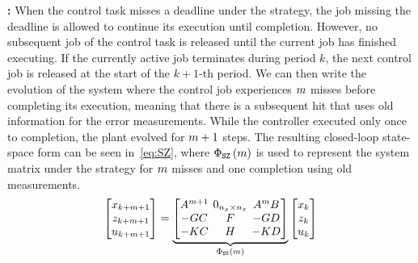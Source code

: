 \textbf{\tSZ{}: }%
%
When the control task misses a deadline under the \tS{} strategy, the job missing the deadline is allowed to continue its execution until completion.
However, no subsequent job of the control task is released until the current job has finished executing.
If the currently active job terminates during period $k$, the next control job is released at the start of the $k+1$-th period.
We can then write the evolution of the system where the control job experiences $m$ misses before completing its execution, meaning that there is a subsequent hit that uses old information for the error measurements.
While the controller executed only once to completion, the plant evolved for $m+1$ steps.
The resulting closed-loop state-space form can be seen in~\eqref{eq:SZ}, where $\Phi{}_{\texttt{S}\texttt{Z}}\left( m \right)$ is used to represent the system matrix under the \tSZ{} strategy for $m$ misses and one completion using old measurements.
%
\begin{equation}
\setlength\arraycolsep{2pt}
\label{eq:SZ}
    \begin{bmatrix}
        x_{k+\nummisses+1} \\
        z_{k+\nummisses+1} \\
        u_{k+\nummisses+1}
    \end{bmatrix} = 
    \underbrace{\begin{bmatrix}
        \Ap^{\nummisses+1}  & 0_{n_x \times n_z}  & \Ap^\nummisses \Bp \\
        -\Bc\Cp             & \Ac                                       & -\Bc\Dp \\
        -\Dc\Cp             & \Cc                                       & -\Dc\Dp
    \end{bmatrix}}_{\clmat{}_{\Skip\Zero}\funof{\nummisses}}
    \begin{bmatrix}
        x_{k} \\
        z_{k} \\
        u_{k}
    \end{bmatrix}
\end{equation}

